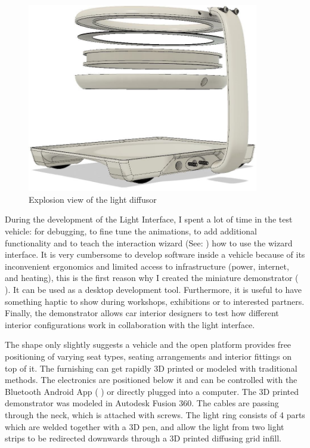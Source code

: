 \begin{figure}
\includegraphics[width=0.9\textwidth]{fig/explosion.JPG}
    \caption[Explosion-view Demonstrator]{Explosion view of the light diffusor}
    \label{fig:demonstratorExplosion}
\end{figure}
During the development of the Light Interface, I spent a lot of time in the test vehicle: for debugging, to fine tune the animations, to add additional functionality and to teach the interaction wizard (See: \emph{}) how to use the wizard interface. It is very cumbersome to develop software inside a vehicle because of its inconvenient ergonomics and limited access to infrastructure (power, internet, and heating), this is the first reason why I created the miniature demonstrator ( \emph{}). It can be used as a desktop development tool. Furthermore, it is useful to have something haptic to show during workshops, exhibitions or to interested partners. Finally, the demonstrator allows car interior designers to test how different interior configurations work in collaboration with the light interface. 

The shape only slightly suggests a vehicle and the open platform provides free positioning of varying seat types, seating arrangements and interior fittings on top of it. The furnishing can get rapidly 3D printed or modeled with traditional methods. The electronics are positioned below it and can be controlled with the Bluetooth Android App ( \emph{}) or directly plugged into a computer. The 3D printed demonstrator was modeled in Autodesk Fusion 360. The cables are passing through the neck, which is attached with screws. The light ring consists of 4 parts which are welded together with a 3D pen, and allow the light from two light strips to be redirected downwards through a 3D printed diffusing grid infill. 


